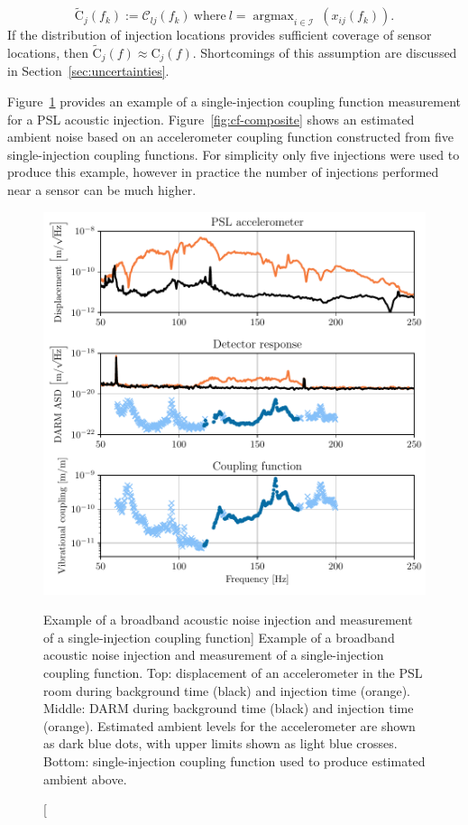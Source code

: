 \begin{equation}\label{eq:ccf}
	\widetilde{\mathrm{C}}_j(f_k) := \mathcal{C}_{lj}(f_k)\ \mathrm{where}\ l = \mathop{argmax}_{i\in\mathcal{I}}\ (x_{ij}(f_k)).
\end{equation}
If the distribution of injection locations provides sufficient coverage of sensor locations, then $\widetilde{\mathrm{C}}_j(f) \approx \mathrm{C}_j(f)$.
Shortcomings of this assumption are discussed in Section~\ref{sec:uncertainties}.

Figure~\ref{fig:cf-example} provides an example of a single-injection coupling function measurement for a \ac{PSL} acoustic injection.
Figure~\ref{fig:cf-composite} shows an estimated ambient noise based on an accelerometer coupling function constructed from five single-injection coupling functions.
For simplicity only five injections were used to produce this example, however in practice the number of injections performed near a sensor can be much higher.

\begin{figure}
	\centering
	\includegraphics{figures/noise-methods/cf-example.pdf}
	\caption
	[Example of a broadband acoustic noise injection and measurement of a single-injection coupling function]
	{
		Example of a broadband acoustic noise injection and measurement of a single-injection coupling function.
		Top: displacement of an accelerometer in the PSL room during background time (black) and injection time (orange).
		Middle: DARM during background time (black) and injection time (orange).
		Estimated ambient levels for the accelerometer are shown as dark blue dots, with upper limits shown as light blue crosses.
		Bottom: single-injection coupling function used to produce estimated ambient above.
		}
	\label{fig:cf-example}
\end{figure}

